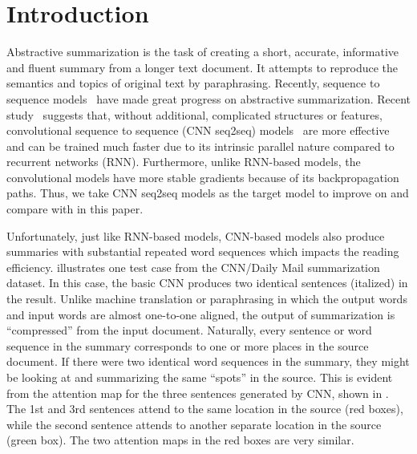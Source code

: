 \section{Introduction}
\label{sec:intro}

Abstractive summarization is the task of creating a short, accurate,
informative and fluent summary from a longer text document.
It attempts to reproduce the semantics and topics of original text
by paraphrasing. 
Recently, sequence to sequence
models~\citep{RushCW15,ChopraAR16,NallapatiZSGX16,SeeLM17,PaulusXS17}
have made great progress on abstractive summarization.
Recent study~\citep{bai2018empirical} suggests that, 
without additional, complicated structures or features,
convolutional sequence to sequence 
(CNN seq2seq) models~\citep{gehring2017convs2s,FanGA18,LiuLZ18} 
are more effective and can be trained much faster due to 
its intrinsic parallel nature compared to recurrent networks (RNN).
Furthermore, unlike RNN-based models, 
the convolutional models have more stable gradients 
because of its backpropagation paths. 
Thus, we take CNN seq2seq models as the target model to improve on and
compare with
in this paper.

Unfortunately, just like RNN-based models, CNN-based models also produce
summaries with substantial repeated word sequences which impacts the reading efficiency.
 illustrates one 
test case from the CNN/Daily Mail summarization dataset. 
In this case, the basic CNN produces two 
identical sentences (italized) in the result. 
Unlike machine translation or paraphrasing in which the output words
and input words are almost one-to-one aligned, the output of summarization
is ``compressed'' from the input document. Naturally, every sentence or 
word sequence in the summary corresponds to one or more places in the source
document. If there were two identical word sequences in the summary,
they might be looking at and summarizing the same ``spots'' in the source.
This is evident from the attention map for the three sentences generated by 
CNN, shown in . The 1st and 3rd sentences attend to
the same location in the source (red boxes), while the second
sentence attends to another separate location in the source (green box). 
The two attention maps in the red boxes are very similar.

